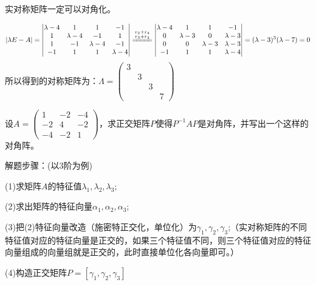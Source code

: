 \documentclass[a4paper]{report}
\begin{document}
\begin{jie}
实对称矩阵一定可以对角化。

\begin{align*}
|\lambda E-A|=
\begin{vmatrix}
\lambda-4&1&1&-1\\
1&\lambda-4&-1&1\\
1&-1&\lambda-4&-1\\
-1&1&1&\lambda-4
\end{vmatrix}\xlongequal{\substack{r_{2}+r_{4}\\ r_{3}+r_{4}}}
\begin{vmatrix}
\lambda-4&1&1&-1\\
0&\lambda-3&0&\lambda-3\\
0&0&\lambda-3&\lambda-3\\
-1&1&1&\lambda-4
\end{vmatrix}=(\lambda-3)^3(\lambda-7)=0
\end{align*}
所以得到的对称矩阵为：$\Lambda=
\begin{pmatrix}
3\\&3\\&&3\\&&&7
\end{pmatrix}
$
\end{jie}

\EX 设$A=
\begin{pmatrix}
1&-2&-4\\
-2&4&-2\\
-4&-2&1
\end{pmatrix}
$，求正交矩阵$P$使得$P^{-1}AP$是对角阵，并写出一个这样的对角阵。

\begin{tips}
解题步骤：(以3阶为例)

(1)求矩阵$A$的特征值$\lambda_1,\lambda_2,\lambda_3;$

(2)求出矩阵的特征向量$\alpha_1,\alpha_2,\alpha_3$;

(3)把(2)特征向量改造（施密特正交化，单位化）为$\gamma_1,\gamma_2,\gamma_3$;（实对称矩阵的不同特征值对应的特征向量是正交的，如果三个特征值不同，则三个特征值对应的特征向量组成的向量组就是正交的，此时直接单位化各向量即可。）

(4)构造正交矩阵$P=[\gamma_1,\gamma_2,\gamma_3]$
\end{tips}
\end{document}
